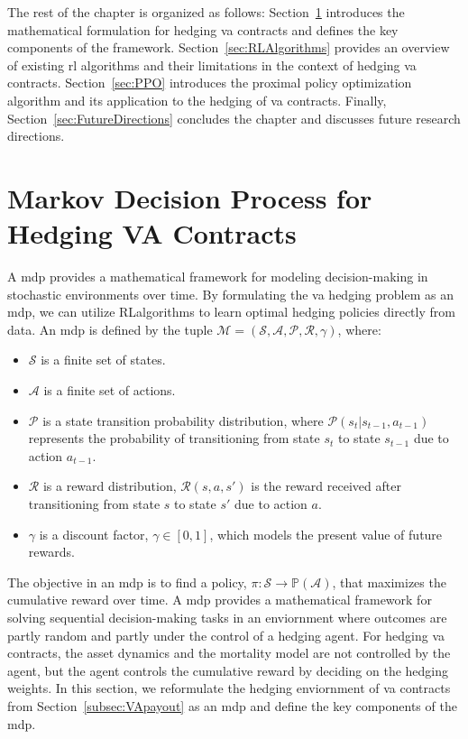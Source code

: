 The rest of the chapter is organized as follows: 
Section~\ref{sec:MDP} introduces the mathematical formulation for hedging \gls{va} contracts and defines the key components of the framework.
Section~\ref{sec:RLAlgorithms} provides an overview of existing \gls{rl} algorithms and their limitations in the context of hedging \gls{va} contracts.
Section~\ref{sec:PPO} introduces the proximal policy optimization algorithm and its application to the hedging of \gls{va} contracts.
Finally, Section~\ref{sec:FutureDirections} concludes the chapter and discusses future research directions.

\section{Markov Decision Process for Hedging VA Contracts} \label{sec:MDP}

A \gls{mdp} provides a mathematical framework for modeling decision-making in stochastic environments over time. 
By formulating the \gls{va} hedging problem as an \gls{mdp}, we can utilize RLalgorithms to learn optimal hedging policies directly from data.
An \gls{mdp} is defined by the tuple $\mathcal{M} = (\mathcal{S}, \mathcal{A}, \mathcal{P}, \mathcal{R}, \gamma)$, where:

\begin{itemize}
    \item $\mathcal{S}$ is a finite set of states.
    \item $\mathcal{A}$ is a finite set of actions.
    \item $\mathcal{P}$ is a state transition probability distribution, where $\mathcal{P}(s_{t}|s_{t-1}, a_{t-1})$ represents the probability of transitioning from state $s_t$ to state $s_{t-1}$ due to action $a_{t-1}$.
    \item $\mathcal{R}$ is a reward distribution, $\mathcal{R}(s, a, s')$ is the reward received after transitioning from state $s$ to state $s'$ due to action $a$.
    \item $\gamma$ is a discount factor, $\gamma \in [0,1]$,  which models the present value of future rewards.
\end{itemize}

The objective in an \gls{mdp} is to find a policy, $\pi: \mathcal{S} \rightarrow \mathbb{P}(\mathcal{A})$, that maximizes the cumulative reward over time.
A \gls{mdp} provides a mathematical framework for solving sequential decision-making tasks in an enviornment where outcomes are partly random and partly under the control of a hedging agent. 
For hedging \gls{va} contracts, the asset dynamics and the mortality model are not controlled by the agent, but the agent controls the cumulative reward by deciding on the hedging weights.
In this section, we reformulate the hedging enviornment of \gls{va} contracts from Section~\ref{subsec:VApayout} as an \gls{mdp} and define the key components of the \gls{mdp}.


